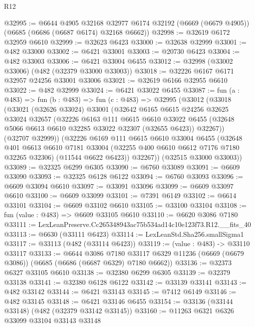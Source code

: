 \begin{lexlean}{R12}
\begin{coremodule}
@32995 := @6644
    @4905
    @32168
    @32977
    @6174
    @32192
    (@6669 (@6679 @4905))
    (@6685 (@6686 (@6687 @6174) @32168 @6662))
@32998 := @32619 @6172 @32959 @6610
@32999 := @32623 @6423
@33000 := @32638 @32999
@33001 := @482 @33000
@33002 := @6421 @33001
@33003 := @20730 @6423
@33004 := @482 @33003
@33006 := @6421 @33004 @6455
@33012 := @32998 (@33002 @33006) (@482 (@32379 @33000 @33003))
@33018 := @32226 @6167 @6171 @32957 @24256 @33001 @33006
@33021 := @32619 @6166 @32955 @6610
@33022 := @482 @32999
@33024 := @6421 @33022 @6455
@33087 := fun (a : @483) =>
  fun (b : @483) =>
  fun (c : @483) =>
  @32995
    (@33012
      (@33018
        (@33021
          (@32626 @33024)
          @33001
          (@32642
            @6165
            @6615
            @24256
            @32625
            @33024
            @32657
            (@32226
              @6163
              @111
              @6615
              @6610
              @33022
              @6455
              (@32648 @5066 @6613 @6610 @32285 @33022 @32307 (@32655 @6423))
              @32267))
          (@32707 @32999))
        (@32226
          @6169
          @111
          @6615
          @6610
          @33004
          @6455
          (@32648
            @401
            @6613
            @6610
            @7181
            @33004
            (@32255 @400 @6610 @6612 @7176 @7180 @32265 @32306)
            (@11544 @6622 @6423))
          @32267))
      (@32515 @33000 @33003))
@33089 := @32325 @6299 @6305
@33090 := @6760 @33089
@33091 := @6609 @33090
@33093 := @32325 @6128 @6122
@33094 := @6760 @33093
@33096 := @6609 @33094 @6610
@33097 := @33091 @33096
@33099 := @6609 @33097 @6610
@33100 := @6609 @33099
@33101 := @7391 @6149
@33102 := @6614 @33101
@33104 := @6609 @33102 @6610
@33105 := @33100 @33104
@33108 := fun (value : @483) => @6609 @33105 @6610
@33110 := @6620 @3086 @7180
@33111 := LexLeanPreserve.Cc265348943ac75b534ad14c10e123f73.R12.__fits_40
@33113 := @6630 (@33111 @6423)
@33114 := LexLeanStd.Sha256.smallSigma1
@33117 := @33113 (@482 (@33114 @6423))
@33119 := (value : @483) -> @33110 @33117
@33133 := @6644
    @3086
    @7180
    @33117
    @6329
    @11236
    (@6669 (@6679 @3086))
    (@6685 (@6686 (@6687 @6329) @7180 @6662))
@33136 := @32373 @6327 @33105 @6610
@33138 := @32380 @6299 @6305
@33139 := @32379 @33138
@33141 := @32380 @6128 @6122
@33142 := @33139 @33141
@33143 := @482 @33142
@33144 := @6421 @33143
@33145 := @7412 @6149
@33146 := @482 @33145
@33148 := @6421 @33146 @6455
@33154 := @33136 (@33144 @33148) (@482 (@32379 @33142 @33145))
@33160 := @11263 @6321 @6326 @33099 @33104 @33143 @33148

\end{coremodule}
\end{lexlean}
